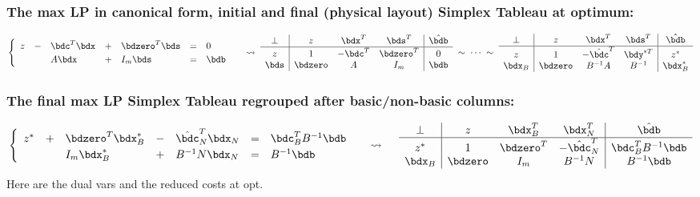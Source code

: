 \documentclass[a4paper]{article}
\begin{document}
\subsubsection*{The max LP in canonical form, initial and final (physical layout) Simplex Tableau at optimum:}%
\[
  \begin{cases}
    \begin{array}[m]{*{5}{lc}}
    z &-& \bdc^T\bdx &+& \bdzero^T\bds &=&  0   \cr
      & &   A\bdx    &+&   I_m\bds     &=& \bdb \cr
    \end{array}
  \end{cases}
  \;\rightsquigarrow\;
    \begin{array}[m]{c|ccc|c}
 \perp &     z   & \bdx^T & \bds^T     & \hat\bdb \cr\hline\rule{0pt}{10pt}
    z  &     1   &-\bdc^T & \bdzero^T  &   0    \cr %
 \bds  & \bdzero & A      & I_m        & \bdb   \cr
    \end{array}
  \;\sim\;\cdots\;\sim\;
    \begin{array}[m]{c|ccc|c}
 \perp &     z   &     \bdx^T &     \bds^T   & \hat\bdb \cr\hline\rule{0pt}{10pt}
 z  &     1   &-\hat\bdc^T &     \bdy^{*T} & z^*\cr %
 \bdx_B& \bdzero &     B^{-1}A&     B^{-1}   & \bdx_B^*   \cr
    \end{array}
\]

\subsubsection*{The final max LP Simplex Tableau regrouped after basic/non-basic columns:}%
\[
  \begin{cases}
    \begin{array}[m]{*{5}{lc}}
      z^* &+& \bdzero^T\bdx_B^* &-& \hat\bdc_N^T\bdx_N &=&  \bdc_B^TB^{-1}\bdb \cr
      & &    I_m\bdx_B^*  &+& B^{-1}N\bdx_N     &=& B^{-1}\bdb \cr
    \end{array}
  \end{cases}
  \;\rightsquigarrow\quad\;
    \begin{array}[m]{c|ccc|c}
   \perp &     z   & \bdx_B^T  & \bdx_N^T & \hat\bdb \cr\hline\rule{0pt}{10pt}
      z^*&     1   & \bdzero^T &-\hat\bdc_N^T & \bdc_B^TB^{-1}\bdb \cr %
  \bdx_B & \bdzero &  I_m  & B^{-1}N      &  B^{-1}\bdb   \cr
    \end{array}
\]
Here  are the dual vars and
 the reduced costs at opt.

\label{LastPageNo}
\end{document}
